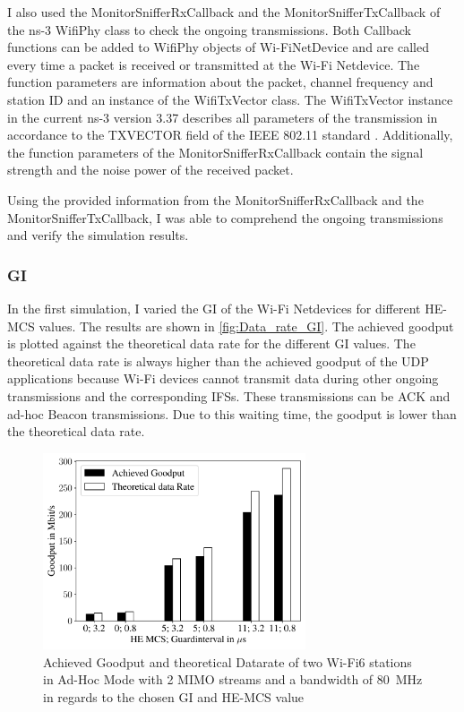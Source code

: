 I also used the MonitorSnifferRxCallback and the MonitorSnifferTxCallback of the ns-3 WifiPhy class to check the ongoing transmissions.
Both Callback functions can be added to WifiPhy objects of Wi-FiNetDevice and are called every time a packet is received or transmitted at the Wi-Fi Netdevice.
The function parameters are information about the packet, channel frequency and station ID and an instance of the WifiTxVector class.
The WifiTxVector instance in the current ns-3 version 3.37 describes all parameters of the transmission in accordance to the TXVECTOR field of the IEEE 802.11 standard \cite{ieee_standard_2021ax}. Additionally, the function parameters of the MonitorSnifferRxCallback contain the signal strength and
the noise power of the received packet.

Using the provided information from the MonitorSnifferRxCallback and the MonitorSnifferTxCallback, I was able to comprehend the ongoing transmissions and
verify the simulation results.

\subsubsection*{\acf{GI}}

In the first simulation, I varied the \ac{GI} of the Wi-Fi Netdevices for different \ac{HE}-\ac{MCS} values.
The results are shown in \autoref{fig:Data_rate_GI}.
The achieved goodput is plotted against the theoretical data rate for the different \ac{GI} values.
The theoretical data rate is always higher than the achieved goodput of the \ac{UDP} applications because Wi-Fi devices
cannot transmit data during other ongoing transmissions and the corresponding \acp{IFS}.
These transmissions can be \ac{ACK} and ad-hoc Beacon transmissions.
Due to this waiting time, the goodput is lower than the theoretical data rate.
\begin{figure}[H]
   \centering
   \includegraphics[width=0.69\textwidth]{Latex/figures/gi_dataRate_simulation.pdf}
   \caption{Achieved Goodput and theoretical Datarate of two Wi-Fi6 stations in Ad-Hoc Mode
   with \num{2} \acf{MIMO} streams and a bandwidth of \SI{80}{\mega\hertz} in regards to the chosen \acf{GI} and \ac{HE}-\ac{MCS} value}%
   \label{fig:Data_rate_GI}%
\end{figure}

